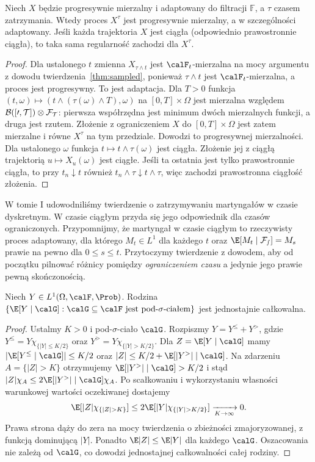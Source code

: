 \begin{stwierdzenie}
Niech $X$ będzie progresywnie mierzalny i adaptowany do
filtracji $\mathbb F$, a $\tau$ czasem zatrzymania.
Wtedy proces $X^\tau$ jest progresywnie mierzalny,
a w szczególności adaptowany. Jeśli każda
trajektoria $X$ jest ciągła (odpowiednio prawostronnie
ciągła), to taka sama regularność zachodzi dla $X^\tau$.
\end{stwierdzenie}
\begin{proof}
Dla ustalonego $t$ zmienna $X_{\tau\wedge t}$
jest $\calF_t$-mierzalna na mocy argumentu z dowodu
twierdzenia~\ref{thm:sampled}, ponieważ $\tau\wedge t$
jest $\calF_t$-mierzalna, a proces jest progresywny.
To jest adaptacja. Dla $T>0$ funkcja
$(t,\omega)\mapsto(t\wedge(\tau(\omega)\wedge T),\omega)$
na $[0,T]\times\Omega$ jest mierzalna względem
$\cal B([0,T])\otimes\cal F_T$: pierwsza współrzędna
jest minimum dwóch mierzalnych funkcji, a druga jest
rzutem. Złożenie z ograniczeniem $X$ do $[0,T]\times\Omega$
jest zatem mierzalne i równe $X^\tau$ na tym przedziale.
Dowodzi to progresywnej mierzalności.
Dla ustalonego $\omega$ funkcja
$t\mapsto t\wedge\tau(\omega)$ jest ciągła.
Złożenie jej z ciągłą trajektorią $u\mapsto X_u(\omega)$
jest ciągłe. Jeśli ta ostatnia jest tylko prawostronnie
ciągła, to przy $t_n\downarrow t$ również
$t_n\wedge\tau\downarrow t\wedge\tau$, więc
zachodzi prawostronna ciągłość złożenia.
\end{proof}

W tomie I udowodniliśmy twierdzenie o zatrzymywaniu
martyngałów w czasie dyskretnym. W czasie ciągłym
przyda się jego odpowiednik dla czasów ograniczonych.
Przypomnijmy, że martyngał w czasie ciągłym to rzeczywisty
proces adaptowany, dla którego $M_t\in L^1$ dla każdego
$t$ oraz $\E[M_t\mid\cal F_s]=M_s$ prawie na pewno dla
$0\le s\le t$. Przytoczymy twierdzenie z dowodem, aby od początku pilnować
różnicy pomiędzy \emph{ograniczeniem czasu} a jedynie
jego prawie pewną skończonością.

\begin{lemat}
\label{lem:ui-cond}
Niech $Y\in L^1(\Omega,\calF,\Prob)$.
Rodzina $\{\E[Y\mid\calG]:\calG\subseteq\calF
\text{ jest pod-$\sigma$-ciałem}\}$ jest jednostajnie całkowalna.
\end{lemat}
\begin{proof}
Ustalmy $K>0$ i pod-$\sigma$-ciało $\calG$.
Rozpiszmy $Y=Y^{\le}+Y^{>}$, gdzie
$Y^{\le}=Y\chi_{\{|Y|\le K/2\}}$ oraz
$Y^{>}=Y\chi_{\{|Y|>K/2\}}$.
Dla $Z=\E[Y\mid\calG]$ mamy
$|\E[Y^{\le}\mid\calG]|\le K/2$ oraz
$|Z|\le K/2+\E[|Y^{>}|\mid\calG]$.
Na zdarzeniu $A=\{|Z|>K\}$ otrzymujemy
$\E[|Y^{>}|\mid\calG]>K/2$ i stąd
$|Z|\chi_A\le2\E[|Y^{>}|\mid\calG]\chi_A$.
Po scałkowaniu i wykorzystaniu własności
warunkowej wartości oczekiwanej dostajemy
\[
\E[|Z|\chi_{\{|Z|>K\}}]
\le2\E[|Y|\chi_{\{|Y|>K/2\}}]\xrightarrow[K\to\infty]{}0.
\]
Prawa strona dąży do zera na mocy twierdzenia
o zbieżności zmajoryzowanej, z funkcją dominującą $|Y|$.
Ponadto $\E|Z|\le\E|Y|$ dla każdego $\calG$.
Oszacowania nie zależą od $\calG$, co dowodzi
jednostajnej całkowalności całej rodziny.
\end{proof}

